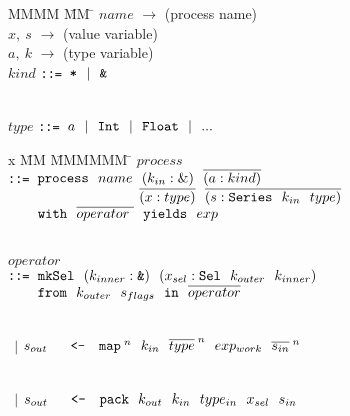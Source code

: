 
\begin{figure}

\begin{tabbing}
MMMM           \= MM \= \kill
$name$  \> $\to$ \> (process name)      \\
$x,~ s$ \> $\to$ \> (value variable)    \\
$a,~ k$ \> $\to$ \> (type variable)
\\[2ex]

$kind$          \> \tt{::=}
                \>      $\tt{*} ~~|~~ \tt{\&}$

\\[2ex]
$type$          \> \tt{::=}
                \>      $a ~~|~~ \tt{Int} ~~|~~ \tt{Float} ~~|~~ ...$ 
\end{tabbing}

\begin{tabbing}
x           \= MM \= MMMMMM \= \kill
$process$ \\
 \> \tt{::=}     
          \> $\tt{process}~~ name~~ (k_{in} : \&)~~ \ov{(a : kind)}$ \\
 \>       \> $~~~~~~~~~~~~~~~~~~~~~~~~~~~~
                        \ov{(x : type)}~~
                        \ov{(s : \tt{Series}~~ k_{in}~~ type)}$      \\
 \>       \> ~~~ $\tt{with}~~     \ov{operator~}~~ 
                \tt{yields}~~       exp$

\\[2ex]
$operator$  \\
 \> \tt{::=}
 \> $\tt{mkSel}
                        ~~ (k_{inner} : \tt{\&})
                        ~~ (x_{sel} : \tt{Sel}~~ k_{outer}~~ k_{inner})$ \\
 \>       \> ~~~ $\tt{from}
                        ~~ k_{outer}
                        ~~ s_{flags}
                        ~~ \tt{in}
                        ~~ \ov{operator}$

 \\[1ex]
 \> $~~|$ \> $s_{out} ~~~~~\tt{<-}
                ~~~ \tt{map}^{\;n}
                        ~~ k_{in}
                        ~~ \ov{type}^{\;n}
                        ~~ exp_{work}
                        ~~ \ov{s_{in}}^{\;n}$ 

 \\[1ex]
 \> $~~|$ \> $s_{out} ~~~~~\tt{<-}
                ~~~ \tt{pack} 
                        ~~ k_{out}
                        ~~ k_{in}
                        ~~ type_{in}
                        ~~ x_{sel}      ~~ s_{in}$


\end{tabbing}
\end{figure}
